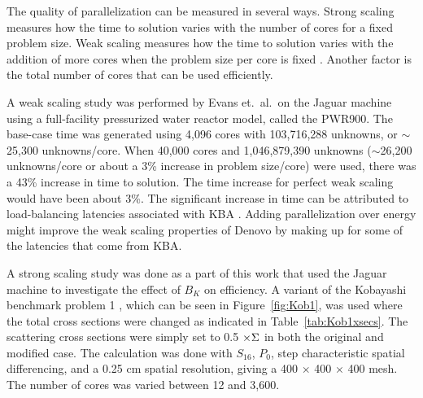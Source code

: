 The quality of parallelization can be measured in several ways. Strong scaling measures how the time to solution varies with the number of cores for a fixed problem size. Weak scaling measures how the time to solution varies with the addition of more cores when the problem size per core is fixed \cite{Bush2010}. Another factor is the total number of cores that can be used efficiently. 

A weak scaling study was performed by Evans et.\ al.\ on the Jaguar machine using a full-facility pressurized water reactor model, called the PWR900. The base-case time was generated using 4,096 cores with 103,716,288 unknowns, or $\sim$25,300 unknowns/core. When 40,000 cores and 1,046,879,390 unknowns ($\sim$26,200 unknowns/core or about a 3\% increase in problem size/core) were used, there was a 43\% increase in time to solution. The time increase for perfect weak scaling would have been about 3\%. The significant increase in time can be attributed to load-balancing latencies associated with KBA \cite{Evans2009d}. Adding parallelization over energy might improve the weak scaling properties of Denovo by making up for some of the latencies that come from KBA.

A strong scaling study was done as a part of this work that used the Jaguar machine to investigate the effect of $B_{K}$ on efficiency. A variant of the Kobayashi benchmark problem 1 \cite{Kobayashi2000}, which can be seen in Figure~\ref{fig:Kob1}, was used where the total cross sections were changed as indicated in Table~\ref{tab:Kob1xsecs}. The scattering cross sections were simply set to 0.5 $\times \Sigma$ in both the original and modified case. The calculation was done with $S_{16}$, $P_{0}$, step characteristic spatial differencing, and a 0.25 cm spatial resolution, giving a 400 $\times$ 400 $\times$ 400 mesh. The number of cores was varied between 12 and 3,600. 

